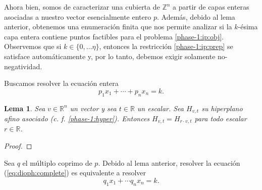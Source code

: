 \documentclass[11pt]{article}
\newtheorem{lemma}{Lema}
\begin{document}
Ahora bien, somos de caracterizar una cubierta de $\mathbb{Z}^n$ a partir de capas enteras asociadas
a nuestro vector esencialmente entero $p$. Además, debido al lema anterior, obtenemos una
enumeración finita que nos permite analizar si la $k$-ésima capa entera contiene puntos factibles
para el problema \ref{phase-1:ip:obj}. Observemos que si $k \in \lbrace 0, \ldots \eta \rbrace$,
entonces la restricción \ref{phase-1:ip:prep} se satisface automáticamente y, por lo tanto, debemos
exigir solamente no-negatividad.

Buscamos resolver la ecuación entera
\begin{equation}
	\label{eq:dioph:complete}
	p_1x_1 + \cdots + p_nx_n = k.
\end{equation}

\begin{lemma}
	\label{phase-1:lemma:invariance}
	Sea $v \in \mathbb{R}^n$ un vector y sea $t \in \mathbb{R}$ un escalar. Sea $H_{v, t}$ su
	hiperplano afino asociado (c. f. \ref{phase-1:hyper}). Entonces $H_{v, t} = H_{r \cdot v, t}$
	para todo escalar $r \in \mathbb{R}$.
\end{lemma}
\begin{proof}
\end{proof}

Sea $q$ el múltiplo coprimo de $p$. Debido al lema anterior, resolver la ecuación
(\ref{eq:dioph:complete}) es equivalente a resolver
\begin{equation}
	\label{eq:dioph:complete:coprime}
	q_1x_1 + \cdots q_nx_n = k.
\end{equation}
\end{document}

